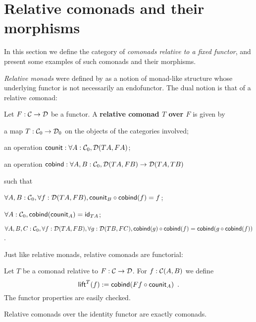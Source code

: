 \documentclass{amsart}
\newcommand{\fat}[1]{\textbf{#1}}
\begin{document}
\section{Relative comonads and their morphisms}\label{sec:comonads}

In this section we define the category of \emph{comonads relative to a fixed functor}, and present some examples 
of such comonads and their morphisms.

\emph{Relative monads} were defined by \textcite{DBLP:conf/fossacs/AltenkirchCU10} as a notion of monad-like structure
whose underlying functor is not necessarily an endofunctor.
The dual notion is that of a relative \emph{co}monad:

\begin{definition}\label{def:rel_comonad}
  Let $F:\C\to\D$ be a functor. A \fat{relative comonad $T$ over $F$} is given by
  \begin{packitem}
   \item a map $T:\C_0 \to \D_0$ on the objects of the categories involved;
   \item an operation $\counit : \forall A : \C_0, \D(TA,FA)$;
   \item an operation $\cobind: \forall A,B:\C_0, \D(TA,FB) \to \D(TA,TB)$
  \end{packitem}
  such that 
  \begin{packitem}
   \item $\forall A,B:\C_0, \forall f:\D(TA,FB), \comp{\cobind(f)}{\counit_B} = f$;
   \item $\forall A : \C_0, \cobind(\counit_A) = \id_{TA}$;
   \item $\forall A,B,C:\C_0, \forall f : \D(TA,FB),\forall g:\D(TB,FC), \\
        \comp{\cobind(f)}{\cobind(g)} = \cobind(\comp{\cobind(f)}{g})$.
  \end{packitem} 
\end{definition}
Just like relative monads, relative comonads are functorial:
\begin{definition}\label{def:lift}
 Let $T$ be a  comonad relative to $F:\C\to\D$.
 For $f : \C(A,B)$ we define
  \[ \lift^T(f) := \cobind(\comp{\counit_A}{Ff}) \enspace .  \]
 The functor properties are easily checked.
\end{definition}
Relative comonads over the identity functor are exactly comonads.
\end{document}
